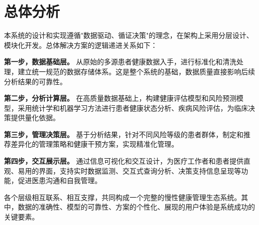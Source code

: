 
\section{总体分析}

本系统的设计和实现遵循"数据驱动、循证决策"的理念，在架构上采用分层设计、模块化开发。总体解决方案的逻辑递进关系如下：

\textbf{第一步，数据基础层。} 从原始的多源患者健康数据入手，进行标准化和清洗处理，建立统一规范的数据存储体系。这是整个系统的基础，数据质量直接影响后续分析结果的可靠性。

\textbf{第二步，分析计算层。} 在高质量数据基础上，构建健康评估模型和风险预测模型，采用统计学和机器学习方法进行患者健康状态分析、疾病风险评估，为临床决策提供量化依据。

\textbf{第三步，管理决策层。} 基于分析结果，针对不同风险等级的患者群体，制定和推荐差异化的管理策略和健康干预方案，实现精准化管理。

\textbf{第四步，交互展示层。} 通过信息可视化和交互设计，为医疗工作者和患者提供直观、易用的界面，支持实时数据监测、交互式查询分析、决策支持信息呈现等功能，促进医患沟通和自我管理。

各个层级相互联系、相互支撑，共同构成一个完整的慢性健康管理生态系统。其中，数据的准确性、模型的可靠性、方案的个性化、展现的用户体验是系统成功的关键要素。
